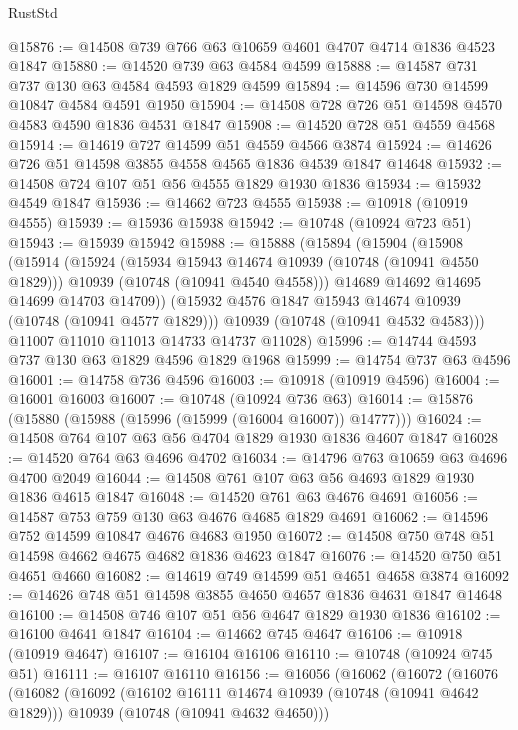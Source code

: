 \begin{lexlean}{RustStd}
\begin{coremodule}
{\begin{coremodule}
{{{{{@15876 := @14508 @739 @766 @63 @10659 @4601 @4707 @4714 @1836 @4523 @1847
@15880 := @14520 @739 @63 @4584 @4599
@15888 := @14587 @731 @737 @130 @63 @4584 @4593 @1829 @4599
@15894 := @14596 @730 @14599 @10847 @4584 @4591 @1950
@15904 := @14508 @728 @726 @51 @14598 @4570 @4583 @4590 @1836 @4531 @1847
@15908 := @14520 @728 @51 @4559 @4568
@15914 := @14619 @727 @14599 @51 @4559 @4566 @3874
@15924 := @14626 @726 @51 @14598 @3855 @4558 @4565 @1836 @4539 @1847 @14648
@15932 := @14508 @724 @107 @51 @56 @4555 @1829 @1930 @1836
@15934 := @15932 @4549 @1847
@15936 := @14662 @723 @4555
@15938 := @10918 (@10919 @4555)
@15939 := @15936 @15938
@15942 := @10748 (@10924 @723 @51)
@15943 := @15939 @15942
@15988 := @15888
    (@15894
      (@15904
        (@15908
          (@15914
            (@15924
              (@15934 @15943 @14674 @10939 (@10748 (@10941 @4550 @1829)))
              @10939
              (@10748 (@10941 @4540 @4558)))
            @14689
            @14692
            @14695
            @14699
            @14703
            @14709))
        (@15932 @4576 @1847 @15943 @14674 @10939 (@10748 (@10941 @4577 @1829)))
        @10939
        (@10748 (@10941 @4532 @4583)))
      @11007
      @11010
      @11013
      @14733
      @14737
      @11028)
@15996 := @14744 @4593 @737 @130 @63 @1829 @4596 @1829 @1968
@15999 := @14754 @737 @63 @4596
@16001 := @14758 @736 @4596
@16003 := @10918 (@10919 @4596)
@16004 := @16001 @16003
@16007 := @10748 (@10924 @736 @63)
@16014 := @15876 (@15880 (@15988 (@15996 (@15999 (@16004 @16007)) @14777)))
@16024 := @14508 @764 @107 @63 @56 @4704 @1829 @1930 @1836 @4607 @1847
@16028 := @14520 @764 @63 @4696 @4702
@16034 := @14796 @763 @10659 @63 @4696 @4700 @2049
@16044 := @14508 @761 @107 @63 @56 @4693 @1829 @1930 @1836 @4615 @1847
@16048 := @14520 @761 @63 @4676 @4691
@16056 := @14587 @753 @759 @130 @63 @4676 @4685 @1829 @4691
@16062 := @14596 @752 @14599 @10847 @4676 @4683 @1950
@16072 := @14508 @750 @748 @51 @14598 @4662 @4675 @4682 @1836 @4623 @1847
@16076 := @14520 @750 @51 @4651 @4660
@16082 := @14619 @749 @14599 @51 @4651 @4658 @3874
@16092 := @14626 @748 @51 @14598 @3855 @4650 @4657 @1836 @4631 @1847 @14648
@16100 := @14508 @746 @107 @51 @56 @4647 @1829 @1930 @1836
@16102 := @16100 @4641 @1847
@16104 := @14662 @745 @4647
@16106 := @10918 (@10919 @4647)
@16107 := @16104 @16106
@16110 := @10748 (@10924 @745 @51)
@16111 := @16107 @16110
@16156 := @16056
    (@16062
      (@16072
        (@16076
          (@16082
            (@16092
              (@16102 @16111 @14674 @10939 (@10748 (@10941 @4642 @1829)))
              @10939
              (@10748 (@10941 @4632 @4650)))
}}}}}
\end{coremodule}}
\end{coremodule}
\end{lexlean}
